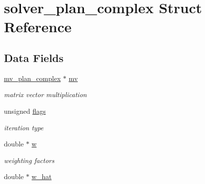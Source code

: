 \hypertarget{structsolver__plan__complex}{
\section{solver\_\-plan\_\-complex Struct Reference}
\label{structsolver__plan__complex}
}
\subsection*{Data Fields}
\begin{CompactItemize}
\item 
\hypertarget{structsolver__plan__complex_86976d623c9e6338227f2ce94ec953ab}{
\hyperlink{structmv__plan__complex}{mv\_\-plan\_\-complex} $\ast$ \hyperlink{structsolver__plan__complex_86976d623c9e6338227f2ce94ec953ab}{mv}}
\label{structsolver__plan__complex_86976d623c9e6338227f2ce94ec953ab}

\begin{CompactList}\small\item\em matrix vector multiplication \item\end{CompactList}\item 
\hypertarget{structsolver__plan__complex_5423b6885c0bd94b563c8cfd9370c942}{
unsigned \hyperlink{structsolver__plan__complex_5423b6885c0bd94b563c8cfd9370c942}{flags}}
\label{structsolver__plan__complex_5423b6885c0bd94b563c8cfd9370c942}

\begin{CompactList}\small\item\em iteration type \item\end{CompactList}\item 
\hypertarget{structsolver__plan__complex_3bb04f250f17c2a4ab5d0b813b7ccf2c}{
double $\ast$ \hyperlink{structsolver__plan__complex_3bb04f250f17c2a4ab5d0b813b7ccf2c}{w}}
\label{structsolver__plan__complex_3bb04f250f17c2a4ab5d0b813b7ccf2c}

\begin{CompactList}\small\item\em weighting factors \item\end{CompactList}\item 
\hypertarget{structsolver__plan__complex_80a69f8b5ddbd33be7041e6c6b0758ce}{
double $\ast$ \hyperlink{structsolver__plan__complex_80a69f8b5ddbd33be7041e6c6b0758ce}{w\_\-hat}}
\label{structsolver__plan__complex_80a69f8b5ddbd33be7041e6c6b0758ce}


\end{CompactItemize}

